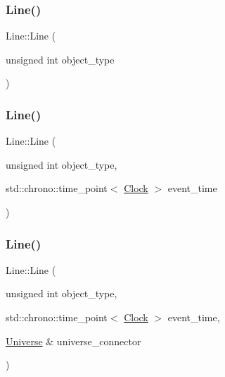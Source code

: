 \mbox{\label{classLine_a4e3242660d8d3c1aa43e932560840552}} 
\subsubsection{\texorpdfstring{Line()}{Line()}\hspace{0.1cm}{\footnotesize\ttfamily [2/4]}}
{\footnotesize\ttfamily Line\+::\+Line (\begin{DoxyParamCaption}\item[{unsigned int}]{object\+\_\+type }\end{DoxyParamCaption})\hspace{0.3cm}{\ttfamily [inline]}}

\mbox{\label{classLine_a5330353765ab0f965a4293bdc7c3564a}} 
\subsubsection{\texorpdfstring{Line()}{Line()}\hspace{0.1cm}{\footnotesize\ttfamily [3/4]}}
{\footnotesize\ttfamily Line\+::\+Line (\begin{DoxyParamCaption}\item[{unsigned int}]{object\+\_\+type,  }\item[{std\+::chrono\+::time\+\_\+point$<$ \mbox{\hyperlink{universe_8h_a0ef8d951d1ca5ab3cfaf7ab4c7a6fd80}{Clock}} $>$}]{event\+\_\+time }\end{DoxyParamCaption})\hspace{0.3cm}{\ttfamily [inline]}}

\mbox{\label{classLine_a740aacdf468a1519f9a01d9cbd1f9219}} 
\subsubsection{\texorpdfstring{Line()}{Line()}\hspace{0.1cm}{\footnotesize\ttfamily [4/4]}}
{\footnotesize\ttfamily Line\+::\+Line (\begin{DoxyParamCaption}\item[{unsigned int}]{object\+\_\+type,  }\item[{std\+::chrono\+::time\+\_\+point$<$ \mbox{\hyperlink{universe_8h_a0ef8d951d1ca5ab3cfaf7ab4c7a6fd80}{Clock}} $>$}]{event\+\_\+time,  }\item[{\mbox{\hyperlink{classUniverse}{Universe}} \&}]{universe\+\_\+connector }\end{DoxyParamCaption})\hspace{0.3cm}{\ttfamily [inline]}}


